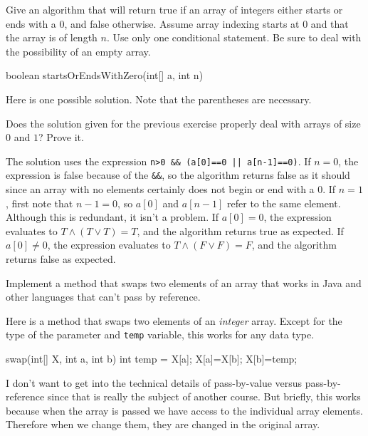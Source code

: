 \begin{exer}
Give an algorithm that will return true if an array of integers either starts or ends with a $0$, and
false otherwise.  Assume array indexing starts at $0$ and that the array is of length $n$.
Use only one conditional statement.  Be sure to deal with the possibility of an empty array.
\begin{code}
    boolean startsOrEndsWithZero(int[] a, int n) {









    }
\end{code}
\begin{answer}
Here is one possible solution.  Note that the parentheses are necessary.
\begin{code}
    boolean startsOrEndsWithZero(int[] a, int n) {
        if( n>0 && (a[0]==0 || a[n-1]==0) ) {
            return true;
        else {
            return false;
        }
    }
\end{code}
\end{answer}
\end{exer}

\begin{ques}
Does the solution given for the previous exercise properly deal with arrays of size $0$ and $1$?  
Prove it.\\
\answerlinefour
\begin{answer}
The solution uses the expression  \verb+n>0 && (a[0]==0 || a[n-1]==0)+.
If $n=0$, the expression is false because of the \verb+&&+, so the algorithm returns false as it should
since an array with no elements certainly does not begin or end with a $0$.
If $n=1$, first note that $n-1=0$, so $a[0]$ and $a[n-1]$ refer to the same element.
Although this is redundant, it isn't a problem.  
If $a[0]=0$, the expression evaluates to $T\wedge (T\vee T)=T$, and the algorithm returns
true as expected.  
If $a[0]\neq 0$, the expression evaluates to $T\wedge (F\vee F)=F$, and the algorithm returns
false as expected.
\end{answer}
\end{ques}

\begin{exa}\label{exa:swapforArray}
Implement a method that swaps two elements of an array that works in Java and other languages
that can't pass by reference.
\begin{sol}
Here is a method that swaps two elements of an {\em integer} array.  Except for the
type of the parameter and \verb+temp+ variable, this works for any data type.
\begin{code}
swap(int[] X, int a, int b) {
    int temp = X[a];
    X[a]=X[b];
    X[b]=temp;
}
\end{code}
I don't want to get into the technical details of pass-by-value versus pass-by-reference since
that is really the subject of another course.  But briefly, 
this works because when the array is passed we have access to the individual array elements.
Therefore when we change them, they are changed in the original array.
\end{sol}
\end{exa}

